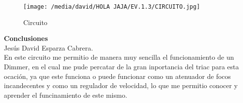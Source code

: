 \documentclass[12pt]{article}
\begin{document}
\begin{figure}[htp]
\centering
\texttt{[image: /media/david/HOLA JAJA/EV.1.3/CIRCUITO.jpg]}
\caption{Circuito}
\label{}
\end{figure}

\textbf{Conclusiones}\\
Jes\'us David Esparza Cabrera.\\
En este circuito me permitio de manera muy sencilla el funcionamiento de un Dimmer, en el cual me pude percatar de la gran inportancia del triac para esta ocaci\'on, ya que este funciona o puede funcionar como un atenuador de focos incandecentes y como un regulador de velocidad, lo que me permitio conocer y aprender el funcinamiento de este mismo.
\end{document}
